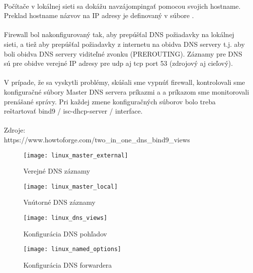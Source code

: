 \paragraph{}
Počítače v lokálnej sieti sa dokážu navzájompingať pomocou svojich hostname. Preklad hostname názvov na IP adresy je definovaný v súbore .
\paragraph{}
Firewall bol nakonfigurovaný tak, aby prepúšťal DNS požiadavky na lokálnej sieti, a tiež aby prepúšťal požiadavky z internetu na obidva DNS servery t.j. aby boli obidva DNS servery viditeľné zvonku (PREROUTING). Záznamy pre DNS sú pre obidve verejné IP adresy pre udp aj tcp port 53 (zdrojový aj cieľový).
\paragraph{}
V prípade, že sa vyskytli problémy, skúšali sme vypnúť firewall, kontrolovali sme konfiguračné súbory Master DNS servera príkazmi  a  a príkazom  sme monitorovali prenášané správy. Pri každej zmene konfiguračných súborov bolo treba reštartovať bind9 / isc-dhcp-server / interface.
\\
\\
\noindent
Zdroje:\\
\noindent
https://www.howtoforge.com/two\_in\_one\_dns\_bind9\_views\\

\begin{figure}[!htb]
\centering
\texttt{[image: linux\_master\_external]}
\caption{Verejné DNS záznamy}
\label{fig:x dns_external}
\end{figure}

\begin{figure}[!htb]
\centering
\texttt{[image: linux\_master\_local]}
\caption{Vnútorné DNS záznamy}
\label{fig:x dns_internal}
\end{figure}

\begin{figure}[!htb]
\centering
\texttt{[image: linux\_dns\_views]}
\caption{Konfigurácia DNS pohľadov}
\label{fig:x dns_views}
\end{figure}

\begin{figure}[!htb]
\centering
\texttt{[image: linux\_named\_options]}
\caption{Konfigurácia DNS forwardera}
\label{fig:x dns_forwarder}
\end{figure}


